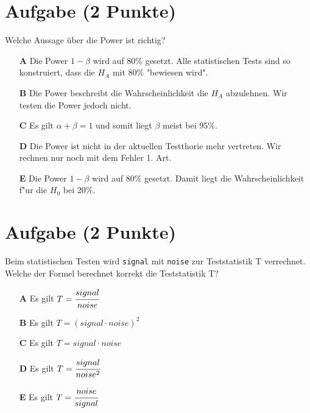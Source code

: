 \documentclass[a4paper, 10pt]{scrartcl}\usepackage[]{graphicx}\usepackage[]{color}
\begin{document}
\section{Aufgabe \hfill (2 Punkte)}

Welche Aussage {\"u}ber die Power ist richtig?



\begin{enumerate}
\item [\textbf{A} \msquare] Die Power $1-\beta$ wird auf 80\% gesetzt. Alle statistischen Tests sind so konstruiert, dass die $H_A$ mit 80\% "bewiesen wird".
\item [\textbf{B} \msquare] Die Power beschreibt die Wahrscheinlichkeit die $H_A$ abzulehnen. Wir testen die Power jedoch nicht.
\item [\textbf{C} \msquare] Es gilt $\alpha + \beta = 1$ und somit liegt $\beta$ meist bei 95\%.
\item [\textbf{D} \msquare] Die Power ist nicht in der aktuellen Testthorie mehr vertreten. Wir rechnen nur noch mit dem Fehler 1. Art.
\item [\textbf{E} \msquare] Die Power $1-\beta$ wird auf 80\% gesetzt. Damit liegt die Wahrscheinlichkeit f{"u}r die $H_0$ bei 20\%.
\end{enumerate}

\section{Aufgabe \hfill (2 Punkte)}

Beim statistischen Testen wird \texttt{signal} mit \texttt{noise} zur
Teststatistik T verrechnet. Welche der Formel berechnet korrekt die
Teststatistik T?



\begin{enumerate}
\item [\textbf{A} \msquare] Es gilt $T = \cfrac{signal}{noise}$
\item [\textbf{B} \msquare] Es gilt $T = (signal \cdot noise)^2$
\item [\textbf{C} \msquare] Es gilt $T = signal \cdot noise$
\item [\textbf{D} \msquare] Es gilt $T = \cfrac{signal}{noise^2}$
\item [\textbf{E} \msquare] Es gilt $T = \cfrac{noise}{signal}$
\end{enumerate}

\end{document}
